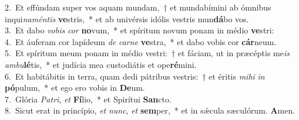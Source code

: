 {2.~}Et effúndam super vos aquam mundam,~† et mundabímini ab ómnibus inqui\textit{na}\textit{mén}\textit{tis} \textbf{ve}stris,~* et ab univérsis idólis vestris mun\textbf{dá}bo vos.\\
{3.~}Et dabo \textit{vo}\textit{bis} \textit{cor} \textbf{no}vum,~* et spíritum novum ponam in médio \textbf{ve}stri:\\
{4.~}Et áuferam cor lapídeum \textit{de} \textit{car}\textit{ne} \textbf{ve}stra,~* et dabo vobis cor \textbf{cár}neum.\\
{5.~}Et spíritum meum ponam in médio vestri:~† et fáciam, ut in præcéptis me\textit{is} \textit{am}\textit{bu}\textbf{lé}tis,~* et judícia mea custodiátis et ope\textbf{ré}mini.\\
{6.~}Et habitábitis in terra, quam dedi pátribus vestris:~† et éritis \textit{mi}\textit{hi} \textit{in} \textbf{pó}pulum,~* et ego ero vobis in \textbf{De}um.\\
{7.~}Glória \textit{Pa}\textit{tri}, \textit{et} \textbf{Fí}lio,~* et Spirítui \textbf{San}cto.\\
{8.~}Sicut erat in princípio, \textit{et} \textit{nunc}, \textit{et} \textbf{sem}per,~* et in sǽcula sæculórum. \textbf{A}men.\\
